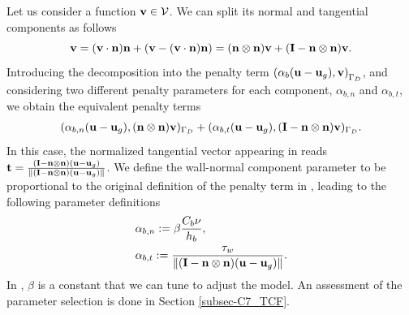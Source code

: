 Let us consider a function $ {\bf v}\in\mathcal{V} $. We can split its normal and tangential components as follows
\begin{equation}
\label{eq-C7_v_decomposition}
{\bf v} = ({\bf v}\cdot{\bf n}){\bf n} + ({\bf v}-({\bf v}\cdot{\bf n}){\bf n})=({\bf n}\otimes{\bf n}){\bf v} + (\mathbf{I}-{\bf n}\otimes{\bf n}){\bf v}.
\end{equation}
Introducing the decomposition  into the penalty term $ \left(\alpha_b({\bf u}-{\bf u}_g),{\bf v}\right)_{\Gamma_D} $, and considering two different penalty parameters for each component, $ \alpha_{b,n} $ and $ \alpha_{b,t} $, we obtain the equivalent penalty terms
\begin{align}
\label{eq-C7_penalty_decomposition}
(\alpha_{b,n}({\bf u}-{\bf u}_g),({\bf n}\otimes{\bf n}){\bf v})_{\Gamma_D} + (\alpha_{b,t}({\bf u}-{\bf u}_g),(\mathbf{I}-{\bf n}\otimes{\bf n}){\bf v})_{\Gamma_D}.
\end{align}
In this case, the normalized tangential vector appearing in  reads $ \mathbf{t}=\frac{(\mathbf{I}-{\bf n}\otimes{\bf n})({\bf u}-{\bf u}_g)}{\|(\mathbf{I}-{\bf n}\otimes{\bf n})({\bf u}-{\bf u}_g)\|} $. We define the wall-normal component parameter to be proportional to the original definition of the penalty term in \cite{bazilevs_weak_2007-1}, leading to the following parameter definitions
\begin{align}
\label{eq-C7_alpha_b_n}
&\alpha_{b,n}:=\beta\frac{C_b\nu}{h_b},\\
\label{eq-C7_alpha_b_t}
&\alpha_{b,t}:=\frac{\tau_w}{\|(\mathbf{I}-{\bf n}\otimes{\bf n})({\bf u}-{\bf u}_g)\|}.
\end{align}
In , $ \beta $ is a constant that we can tune to adjust the model. An assessment of the parameter selection is done in Section \ref{subsec-C7_TCF}.

